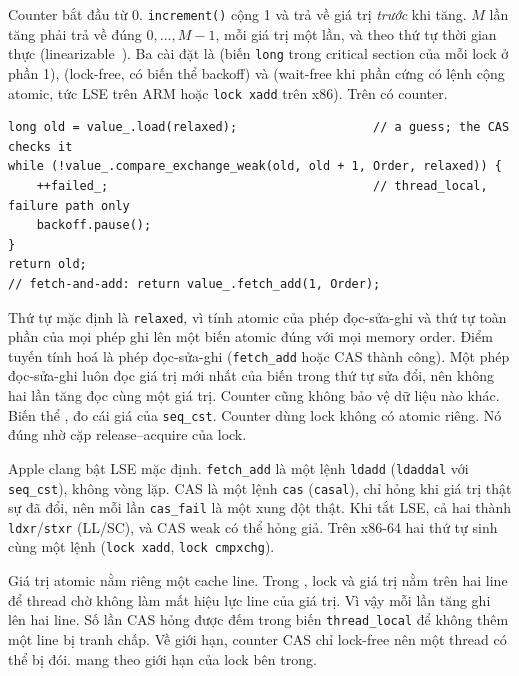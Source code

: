 Counter bắt đầu từ 0. \texttt{increment()} cộng 1 và trả về giá trị \emph{trước} khi tăng. $M$ lần tăng
phải trả về đúng $0, \dots, M - 1$, mỗi giá trị một lần, và theo thứ tự thời gian thực
(linearizable~\cite{herlihy1990linearizability}). Ba cài đặt là  (biến
\texttt{long} trong critical section của mỗi lock ở phần 1),  (lock-free, có biến thể
backoff) và  (wait-free khi phần cứng có lệnh cộng atomic, tức LSE trên ARM hoặc
\texttt{lock xadd} trên x86).
Trên  có  counter.
\begin{lstlisting}
long old = value_.load(relaxed);                   // a guess; the CAS checks it
while (!value_.compare_exchange_weak(old, old + 1, Order, relaxed)) {
    ++failed_;                                     // thread_local, failure path only
    backoff.pause();
}
return old;
// fetch-and-add: return value_.fetch_add(1, Order);
\end{lstlisting}

Thứ tự mặc định là \texttt{relaxed}, vì tính atomic của phép đọc-sửa-ghi và thứ tự toàn phần của mọi phép
ghi lên một biến atomic đúng với mọi memory order. Điểm tuyến tính hoá là phép đọc-sửa-ghi
(\texttt{fetch\_add} hoặc CAS thành công). Một phép đọc-sửa-ghi luôn đọc giá trị mới nhất của biến trong
thứ tự sửa đổi, nên không hai lần tăng đọc cùng một giá trị. Counter cũng không bảo vệ dữ liệu nào khác. Biến thể
,  đo cái giá của \texttt{seq\_cst}. Counter dùng lock không có
atomic riêng. Nó đúng nhờ cặp release--acquire của lock.

Apple clang bật LSE mặc định. \texttt{fetch\_add} là một lệnh
\texttt{ldadd} (\texttt{ldaddal} với \texttt{seq\_cst}), không vòng lặp. CAS là một lệnh \texttt{cas}
(\texttt{casal}), chỉ hỏng khi giá trị thật sự đã đổi, nên mỗi lần \texttt{cas\_fail} là một xung đột thật.
Khi tắt LSE, cả hai thành \texttt{ldxr}/\texttt{stxr} (LL/SC), và CAS weak có thể hỏng giả. Trên x86-64
hai thứ tự sinh cùng một lệnh (\texttt{lock xadd}, \texttt{lock cmpxchg}).

Giá trị atomic nằm riêng một cache line. Trong , lock và giá trị nằm trên hai line
để thread chờ không làm mất hiệu lực line của giá trị. Vì vậy mỗi lần tăng ghi lên hai line. Số lần CAS hỏng
được đếm trong biến \texttt{thread\_local} để không thêm một line bị tranh chấp. Về giới hạn, counter CAS
chỉ lock-free nên một thread có thể bị đói.  mang theo giới hạn của lock bên trong.
